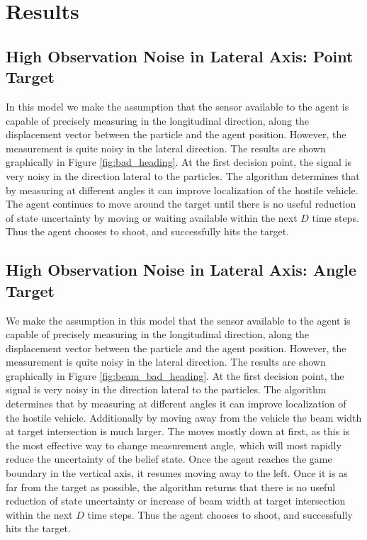 \section{Results \label{ref:results}}

\subsection{High Observation Noise in Lateral Axis: Point Target}

	In this model we make the assumption that the sensor available to the agent is capable of precisely measuring in the longitudinal direction, along the displacement vector between the particle and the agent position.  However, the measurement is quite noisy in the lateral direction.  The results are shown graphically in Figure \ref{fig:bad_heading}.  At the first decision point, the signal is very noisy in the direction lateral to the particles.  The algorithm determines that by measuring at different angles it can improve localization of the hostile vehicle. The agent continues to move around the target until there is no useful reduction of state uncertainty by moving or waiting available within the next $D$ time steps.  Thus the agent chooses to shoot, and successfully hits the target.
	
	
	
\subsection{High Observation Noise in Lateral Axis: Angle Target}
	We make the assumption in this model that the sensor available to the agent is capable of precisely measuring in the longitudinal direction, along the displacement vector between the particle and the agent position.  However, the measurement is quite noisy in the lateral direction.  The results are shown graphically in Figure \ref{fig:beam_bad_heading}.  At the first decision point, the signal is very noisy in the direction lateral to the particles.  The algorithm determines that by measuring at different angles it can improve localization of the hostile vehicle.  Additionally by moving away from the vehicle the beam width at target intersection is much larger.  The moves mostly down at first, as this is the most effective way to change measurement angle, which will most rapidly reduce the uncertainty of the belief state.  Once the agent reaches the game boundary in the vertical axis, it resumes moving away to the left.  Once it is as far from the target as possible, the algorithm returns that there is no useful reduction of state uncertainty or increase of beam width at target intersection within the next $D$ time steps.  Thus the agent chooses to shoot, and successfully hits the target.
	

